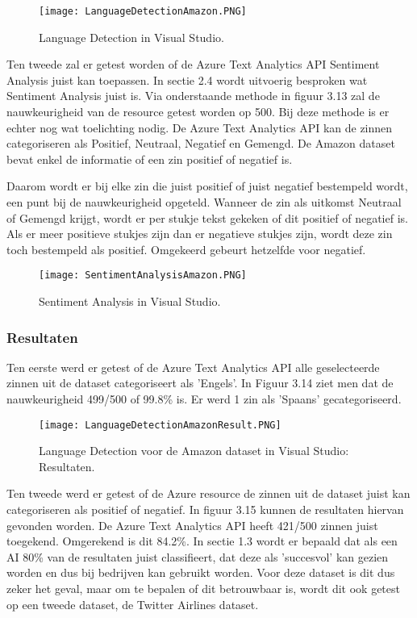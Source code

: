 \begin{figure}[!htbp]
    \texttt{[image: LanguageDetectionAmazon.PNG]}
    \caption{\label{azurelanguagedetectionamazon}Language Detection in Visual Studio.}
\end{figure}
\FloatBarrier

Ten tweede zal er getest worden of de Azure Text Analytics API Sentiment Analysis juist kan toepassen. In sectie 2.4 wordt uitvoerig besproken wat Sentiment Analysis juist is. Via onderstaande methode in figuur 3.13 zal de nauwkeurigheid van de resource getest worden op 500. Bij deze methode is er echter nog wat toelichting nodig. De Azure Text Analytics API kan de zinnen categoriseren als Positief, Neutraal, Negatief en Gemengd. De Amazon dataset bevat enkel de informatie of een zin positief of negatief is. 

Daarom wordt er bij elke zin die juist positief of juist negatief bestempeld wordt, een punt bij de nauwkeurigheid opgeteld. Wanneer de zin als uitkomst Neutraal of Gemengd krijgt, wordt er per stukje tekst gekeken of dit positief of negatief is. Als er meer positieve stukjes zijn dan er negatieve stukjes zijn, wordt deze zin toch bestempeld als positief. Omgekeerd gebeurt hetzelfde voor negatief. 

\begin{figure}[!htbp]
    \texttt{[image: SentimentAnalysisAmazon.PNG]}
    \caption{\label{azuresentimentanalysisamazon}Sentiment Analysis in Visual Studio.}
\end{figure}
\FloatBarrier

\subsubsection{Resultaten}
\label{amazondatasetresultatenazure}
Ten eerste werd er getest of de Azure Text Analytics API alle geselecteerde zinnen uit de dataset categoriseert als 'Engels'. In Figuur 3.14 ziet men dat de nauwkeurigheid 499/500 of 99.8\% is. Er werd 1 zin als 'Spaans' gecategoriseerd.

\begin{figure}[!htbp]
    \texttt{[image: LanguageDetectionAmazonResult.PNG]}
    \caption{\label{azurelanguagedetectionamazonresults}Language Detection voor de Amazon dataset in Visual Studio: Resultaten.}
\end{figure}
\FloatBarrier 

Ten tweede werd er getest of de Azure resource de zinnen uit de dataset juist kan categoriseren als positief of negatief. In figuur 3.15 kunnen de resultaten hiervan gevonden worden. De Azure Text Analytics API heeft 421/500 zinnen juist toegekend. Omgerekend is dit 84.2\%. In sectie 1.3 wordt er bepaald dat als een AI 80\% van de resultaten juist classifieert, dat deze als 'succesvol' kan gezien worden en dus bij bedrijven kan gebruikt worden. Voor deze dataset is dit dus zeker het geval, maar om te bepalen of dit betrouwbaar is, wordt dit ook getest op een tweede dataset, de Twitter Airlines dataset. 

